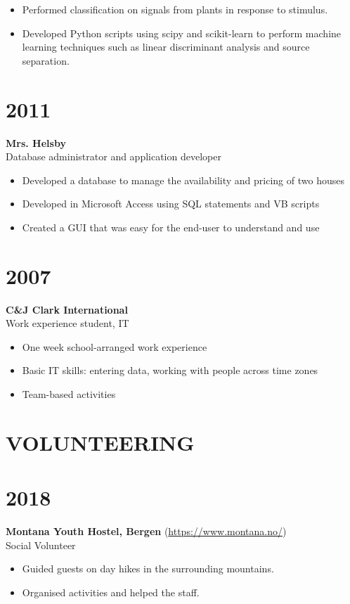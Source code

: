 \documentclass[margin]{res}
\begin{document}
\begin{resume}
\begin{itemize}

\item
Performed classification on signals from plants in response to stimulus.

\item
Developed Python scripts using scipy and scikit-learn to perform machine learning techniques such as linear discriminant analysis and source separation.

\end{itemize}

\normalsize{\section{2011}}
{\bf Mrs. Helsby} \\
Database administrator and application developer \\
\begin{itemize}
\item Developed a database to manage the availability and pricing of two houses
\item Developed in Microsoft Access using SQL statements and VB scripts
\item Created a GUI that was easy for the end-user to understand and use
\end{itemize}

\normalsize{\section{2007}}
{\bf C\&J Clark International} \\
Work experience student, IT \\
\begin{itemize}
\item One week school-arranged work experience
\item Basic IT skills: entering data, working with people across time zones
\item Team-based activities
\end{itemize}

\section{VOLUNTEERING}

\normalsize{\section{2018}}
{\bf Montana Youth Hostel, Bergen} (\href{https://www.montana.no/}{https://www.montana.no/}) \\
Social Volunteer \\
\begin{itemize}
\item
Guided guests on day hikes in the surrounding mountains.
\item
Organised activities and helped the staff.
\end{itemize}


\end{resume}
\end{document}
